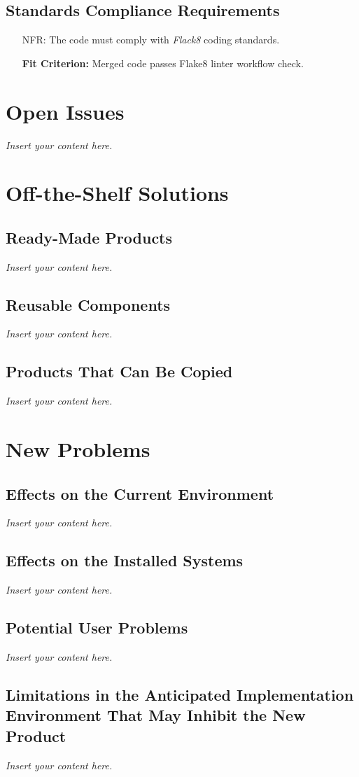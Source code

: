 \documentclass[12pt]{article}
\newcommand{\lips}{\textit{Insert your content here.}}
\newcounter{nfrnum} %
\newcommand{\rthenfrnum}{NFR\refstepcounter{nfrnum}\thenfrnum:}
\begin{document}
\subsection{Standards Compliance Requirements}
\begin{itemize}
\item[\rthenfrnum]
The code must comply with \textit{Flack8} coding standards.

\textbf{Fit Criterion:} Merged code passes Flake8 linter workflow check.
\end{itemize}

\section{Open Issues}
\lips

\section{Off-the-Shelf Solutions}
\subsection{Ready-Made Products}
\lips
\subsection{Reusable Components}
\lips
\subsection{Products That Can Be Copied}
\lips

\section{New Problems}
\subsection{Effects on the Current Environment}
\lips
\subsection{Effects on the Installed Systems}
\lips
\subsection{Potential User Problems}
\lips
\subsection{Limitations in the Anticipated Implementation Environment That May
Inhibit the New Product}
\lips
\end{document}
